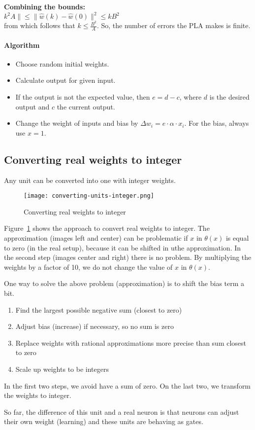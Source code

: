 \documentclass[main]{subfiles}
\begin{document}
\textbf{Combining the bounds:}\\
\indent \indent $k^2 A \| \leq \| \hat{w}(k) - \hat{w}(0) \|^2 \leq k B^2$\\
\indent \indent from which follows that $k \leq \frac{B^2}{A}$. So, the number of errors the PLA makes is finite.

\paragraph{Algorithm}
\begin{itemize}[noitemsep,nolistsep]
	\item Choose random initial weights.
	\item Calculate output for given input.
	\item If the output is not the expected value, then $e=d-c$, where $d$ is the desired output and $c$ the current output.
	\item Change the weight of inputs and bias by $\Delta w_i=e\cdot\alpha\cdot x_i$. For the bias, always use $x=1$.
\end{itemize}

\subsection{Converting real weights to integer}
Any unit can be converted into one with integer weights.

\begin{figure}[H]
	\centering
	\texttt{[image: converting-units-integer.png]}
	\caption{Converting real weights to integer}
	\label{fig:converting}
\end{figure}

Figure~\ref{fig:converting} shows the approach to convert real weights to integer. The approximation (images left and center) can be problematic if $x$ in $\theta(x)$ is equal to zero (in the real setup), because it can be shifted in uthe approximation.
In the second step (images center and right) there is no problem. By multiplying the weights by a factor of 10, we do not change the value of $x$ in $\theta(x)$.

One way to solve the above problem (approximation) is to shift the bias term a bit.

\begin{enumerate}
\item Find the largest possible negative sum (closest to zero)
\item Adjust bias (increase) if necessary, so no sum is zero
\item Replace weights with rational approximations more precise than sum closest to zero
\item Scale up weights to be integers
\end{enumerate}

In the first two steps, we avoid have a sum of zero. On the last two, we transform the weights to integer.

So far, the difference of this unit and a real neuron is that neurons can adjust their own weight (learning) and these units are behaving as gates.
\end{document}
